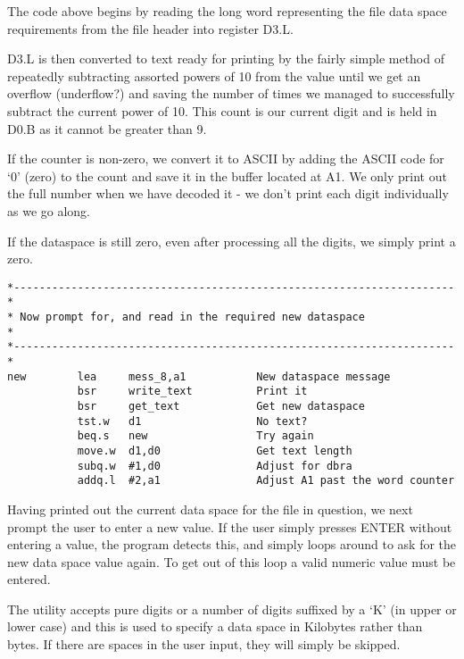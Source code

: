 The code above begins by reading the long word representing the file
    data space requirements from the file header into register D3.L.

D3.L is then converted to text ready for printing by the fairly
    simple method of repeatedly subtracting assorted powers of 10 from the
    value until we get an overflow (underflow?) and saving the number of times
    we managed to successfully subtract the current power of 10. This count is
    our current digit and is held in D0.B as it cannot be greater than
    9.

If the counter is non-{}zero, we convert it to ASCII by adding the
    ASCII code for `0' (zero) to the count and save it in the buffer located
    at A1. We only print out the full number when we have decoded it -{} we
    don't print each digit individually as we go along.

If the dataspace is still zero, even after processing all the
    digits, we simply print a zero.

\begin{lstlisting}[firstnumber=last,caption={Dataspace Program - Part 7 - Get New Dataspace}]
*---------------------------------------------------------------------*
* Now prompt for, and read in the required new dataspace              *
*---------------------------------------------------------------------*
new        lea     mess_8,a1           New dataspace message
           bsr     write_text          Print it
           bsr     get_text            Get new dataspace
           tst.w   d1                  No text?
           beq.s   new                 Try again
           move.w  d1,d0               Get text length
           subq.w  #1,d0               Adjust for dbra
           addq.l  #2,a1               Adjust A1 past the word counter
\end{lstlisting}

Having printed out the current data space for the file in question,
    we next prompt the user to enter a new value. If the user simply presses
    ENTER without entering a value, the program detects this, and simply loops
    around to ask for the new data space value again. To get out of this loop
    a valid numeric value must be entered.

The utility accepts pure digits or a number of digits suffixed by a
    `K' (in upper or lower case) and this is used to specify a data space in
    Kilobytes rather than bytes. If there are spaces in the user input, they
    will simply be skipped.


